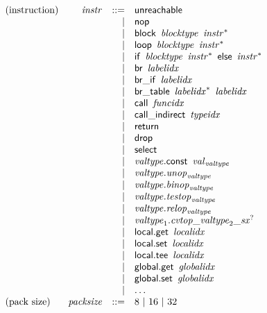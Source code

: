 $$
\begin{array}{@{}lrrl@{}l@{}}
\mbox{(instruction)} & {\mathit{instr}} &::=& \mathsf{unreachable} \\ &&|&
\mathsf{nop} \\ &&|&
\mathsf{block}~\,{\mathit{blocktype}}~\,{{\mathit{instr}}^\ast} \\ &&|&
\mathsf{loop}~\,{\mathit{blocktype}}~\,{{\mathit{instr}}^\ast} \\ &&|&
\mathsf{if}~\,{\mathit{blocktype}}~\,{{\mathit{instr}}^\ast}~\,\mathsf{else}~\,{{\mathit{instr}}^\ast} \\ &&|&
\mathsf{br}~\,{\mathit{labelidx}} \\ &&|&
\mathsf{br\_if}~\,{\mathit{labelidx}} \\ &&|&
\mathsf{br\_table}~\,{{\mathit{labelidx}}^\ast}~\,{\mathit{labelidx}} \\ &&|&
\mathsf{call}~\,{\mathit{funcidx}} \\ &&|&
\mathsf{call\_indirect}~\,{\mathit{typeidx}} \\ &&|&
\mathsf{return} \\ &&|&
\mathsf{drop} \\ &&|&
\mathsf{select} \\ &&|&
{\mathit{valtype}}.\mathsf{const}~\,{{\mathit{val}}}_{{\mathit{valtype}}} \\ &&|&
{\mathit{valtype}} . {{\mathit{unop}}}_{{\mathit{valtype}}} \\ &&|&
{\mathit{valtype}} . {{\mathit{binop}}}_{{\mathit{valtype}}} \\ &&|&
{\mathit{valtype}} . {{\mathit{testop}}}_{{\mathit{valtype}}} \\ &&|&
{\mathit{valtype}} . {{\mathit{relop}}}_{{\mathit{valtype}}} \\ &&|&
{\mathit{valtype}}_{{1}} . {{{{{\mathit{cvtop}}}{\mathsf{\_}}}{{\mathit{valtype}}_{{2}}}}{\mathsf{\_}}}{{{\mathit{sx}}^?}} \\ &&|&
\mathsf{local.get}~\,{\mathit{localidx}} \\ &&|&
\mathsf{local.set}~\,{\mathit{localidx}} \\ &&|&
\mathsf{local.tee}~\,{\mathit{localidx}} \\ &&|&
\mathsf{global.get}~\,{\mathit{globalidx}} \\ &&|&
\mathsf{global.set}~\,{\mathit{globalidx}} \\ &&|&
\dots \\
\mbox{(pack size)} & {\mathit{packsize}} &::=& 8 ~|~ 16 ~|~ 32 \\

\end{array}$$
